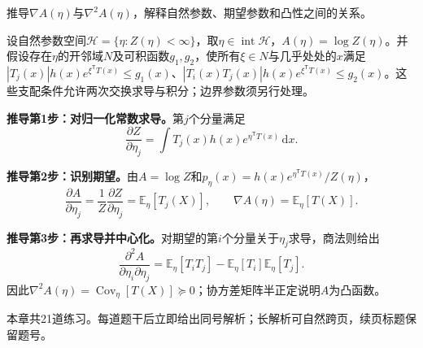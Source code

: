 \begin{derivationgoalbox}
推导$\nabla A(\eta)$与$\nabla^2A(\eta)$，解释自然参数、期望参数和凸性之间的关系。
\end{derivationgoalbox}
\begin{derivationprepbox}
设自然参数空间$\mathcal H=\{\eta:Z(\eta)<\infty\}$，取$\eta\in\operatorname{int}\mathcal H$，$A(\eta)=\log Z(\eta)$。并假设存在$\eta$的开邻域$N$及可积函数$g_1,g_2$，使所有$\xi\in N$与几乎处处的$x$满足$|T_j(x)|h(x)e^{\xi^{\mathsf T}T(x)}\le g_1(x)$、$|T_i(x)T_j(x)|h(x)e^{\xi^{\mathsf T}T(x)}\le g_2(x)$。这些支配条件允许两次交换求导与积分；边界参数须另行处理。
\end{derivationprepbox}
\textbf{推导第1步：对归一化常数求导。}第$j$个分量满足
\[
\frac{\partial Z}{\partial\eta_j}
=\int T_j(x)h(x)e^{\eta^{\mathsf T}T(x)}\,\mathrm dx.
\]

\textbf{推导第2步：识别期望。}由$A=\log Z$和$p_\eta(x)=h(x)e^{\eta^{\mathsf T}T(x)}/Z(\eta)$，
\[
\frac{\partial A}{\partial\eta_j}
=\frac{1}{Z}\frac{\partial Z}{\partial\eta_j}
=\mathbb E_\eta[T_j(X)],
\qquad
\nabla A(\eta)=\mathbb E_\eta[T(X)].
\]

\textbf{推导第3步：再求导并中心化。}对期望的第$i$个分量关于$\eta_j$求导，商法则给出
\[
\frac{\partial^2A}{\partial\eta_i\partial\eta_j}
=\mathbb E_\eta[T_iT_j]-\mathbb E_\eta[T_i]\mathbb E_\eta[T_j].
\]
因此$\nabla^2A(\eta)=\operatorname{Cov}_\eta[T(X)]\succeq0$；协方差矩阵半正定说明$A$为凸函数。

\label{struct:V1-C05-CH16}
\begin{chapterexercisebox}
\label{struct:V1-C05-CH34}
\label{struct:V1-C05-CH35}
本章共21道练习。每道题干后立即给出同号解析；长解析可自然跨页，续页标题保留题号。
\end{chapterexercisebox}

